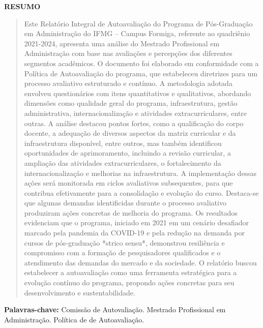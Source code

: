\newenvironment{meuresumo}{
  \clearpage
  \small
  \vspace{-1cm}
  \begin{center}
    \bfseries RESUMO
    \vspace{0.5em}
  \end{center}
  \begin{quote}
}{
  \end{quote}
  \vspace{-1.1em}
  \begin{center}
  \begin{minipage}{0.87\textwidth} 
  \textbf{Palavras-chave:} Comissão de Autovaliação. 
  Mestrado Profissional em Administração. Política de de Autoavaliação.
  \end{minipage}
  \end{center}
  \clearpage
}

\begin{meuresumo}
Este Relatório Integral de Autoavaliação do Programa de Pós-Graduação em 
Administração do IFMG – Campus Formiga, referente ao quadriênio 2021-2024, 
apresenta uma análise do Mestrado Profissional em Administração 
com base nas avaliações e percepções dos diferentes segmentos acadêmicos. 
O documento foi elaborado em conformidade com a Política de Autoavaliação 
do programa, que estabeleceu diretrizes para um processo avaliativo 
estruturado e contínuo. A metodologia adotada envolveu questionários com 
itens quantitativos e qualitativos, abordando dimensões como qualidade geral 
do programa, infraestrutura, gestão administrativa, internacionalização e 
atividades extracurriculares, entre outras. A análise destacou pontos 
fortes, como a qualificação do corpo docente, a adequação de diversos 
aspectos da matriz curricular e da infraestrutura disponível, entre outros, 
mas também identificou oportunidades de aprimoramento, incluindo a revisão 
curricular, a ampliação das atividades extracurriculares, o fortalecimento 
da internacionalização e melhorias na infraestrutura. A implementação dessas 
ações será monitorada em ciclos avaliativos subsequentes, para que contribua 
efetivamente para a consolidação e evolução do curso. Destaca-se que algunas 
demandas identificidas durante o processo avaliativo produziram ações 
concretas de melhoria do programa. Os resultados evidenciam que o programa, 
iniciado em 2021 em um cenário desafiador marcado pela pandemia da COVID-19 e 
pela redução na demanda por cursos de pós-graduação *strico sensu*, demonstrou 
resiliência e compromisso com a formação de pesquisadores qualificados 
e o atendimento das demandas do mercado e da sociedade. O relatório buscou 
estabelecer a autoavaliação como uma ferramenta estratégica para a 
evolução contínuo do programa, propondo ações concretas para seu 
desenvolvimento e sustentabilidade. 
\end{meuresumo}



\clearpage
{}


